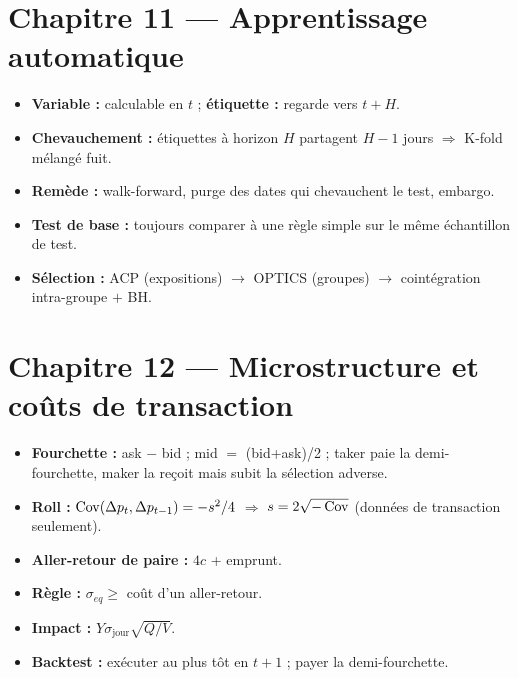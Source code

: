 \section*{Chapitre 11 — Apprentissage automatique}
\begin{itemize}[leftmargin=1.2em,itemsep=0.05em]
\item \textbf{Variable :} calculable en $t$ ; \textbf{étiquette :} regarde vers $t+H$.
\item \textbf{Chevauchement :} étiquettes à horizon $H$ partagent $H-1$ jours $\Rightarrow$ K-fold mélangé fuit.
\item \textbf{Remède :} walk-forward, purge des dates qui chevauchent le test, embargo.
\item \textbf{Test de base :} toujours comparer à une règle simple sur le même échantillon de test.
\item \textbf{Sélection :} ACP (expositions) $\to$ OPTICS (groupes) $\to$ cointégration intra-groupe $+$ BH.
\end{itemize}

\section*{Chapitre 12 — Microstructure et coûts de transaction}
\begin{itemize}[leftmargin=1.2em,itemsep=0.05em]
\item \textbf{Fourchette :} ask $-$ bid ; mid $=$ (bid+ask)/2 ; taker paie la demi-fourchette, maker la reçoit mais subit la sélection adverse.
\item \textbf{Roll :} $\operatorname{Cov}(\Delta p_t,\Delta p_{t-1}) = -s^2/4$ $\Rightarrow$ $s = 2\sqrt{-\operatorname{Cov}}$ (données de transaction seulement).
\item \textbf{Aller-retour de paire :} $4c$ + emprunt.
\item \textbf{Règle :} $\sigma_{eq}\ge$ coût d'un aller-retour.
\item \textbf{Impact :} $Y\sigma_{\text{jour}}\sqrt{Q/V}$.
\item \textbf{Backtest :} exécuter au plus tôt en $t+1$ ; payer la demi-fourchette.
\end{itemize}

